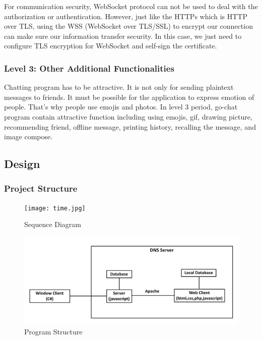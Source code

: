 \documentclass[a4paper,11pt]{article}
\begin{document}
For communication security, WebSocket protocol can not be used to deal with the authorization or authentication. However, just like the HTTPs which is HTTP over TLS, using the WSS (WebSocket over TLS/SSL) to encrypt our connection can make sure our information transfer security. In this case, we just need to configure TLS encryption for WebSocket and self-sign the certificate.

\subsubsection{Level 3: Other Additional Functionalities}

Chatting program has to be attractive. It is not only for sending plaintext messages to friends. It must be possible for the application to express emotion of people. That's why people use emojis and photos. In level 3 period, go-chat program contain attractive function including using emojis, gif, drawing picture, recommending friend, offline message, printing history, recalling the message, and image compose.

\subsection{Design}

\subsubsection{Project Structure}

\begin{figure}[h]
\centering
\texttt{[image: time.jpg]}
\caption{\label{fig:UML}Sequence Diagram}
\end{figure}

\begin{figure}[h]
\centering
\includegraphics[width = 0.8 \textwidth ]{program_structure.jpeg}
\caption{\label{fig:UML}Program Structure}
\end{figure}




\end{document}
